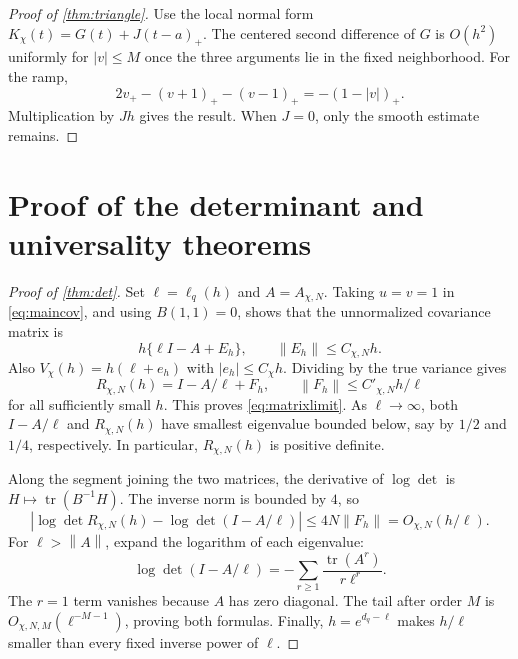 \documentclass[11pt]{article}
\theoremstyle{definition}
\newcommand{\tr}{\operatorname{tr}}
\newcommand{\norm}[1]{\left\|#1\right\|}
\begin{document}
\begin{proof}[Proof of \cref{thm:triangle}]
Use the local normal form $K_\chi(t)=G(t)+J(t-a)_+$. The centered second
difference of $G$ is $O(h^2)$ uniformly for $|v|\le M$ once the three arguments
lie in the fixed neighborhood. For the ramp,
\[
 2v_+-(v+1)_+-(v-1)_+=-(1-|v|)_+.
\]
Multiplication by $Jh$ gives the result. When $J=0$, only the smooth estimate remains.
\end{proof}

\section{Proof of the determinant and universality theorems}

\begin{proof}[Proof of \cref{thm:det}]
Set $\ell=\ell_q(h)$ and $A=A_{\chi,N}$. Taking $u=v=1$ in
\cref{eq:maincov}, and using $B(1,1)=0$, shows that the unnormalized covariance
matrix is
\[
 h\{\ell I-A+E_h\},\qquad \norm{E_h}\le C_{\chi,N}h.
\]
Also $V_\chi(h)=h(\ell+e_h)$ with $|e_h|\le C_\chi h$.
Dividing by the true variance gives
\begin{equation}\label{eq:Rapprox}
 R_{\chi,N}(h)=I-A/\ell+F_h,\qquad
 \norm{F_h}\le C'_{\chi,N}h/\ell
\end{equation}
for all sufficiently small $h$. This proves \cref{eq:matrixlimit}.
As $\ell\to\infty$, both $I-A/\ell$ and $R_{\chi,N}(h)$ have smallest
eigenvalue bounded below, say by $1/2$ and $1/4$, respectively. In particular,
$R_{\chi,N}(h)$ is positive definite.

Along the segment joining the two matrices, the derivative of $\log\det$ is
$H\mapsto\tr(B^{-1}H)$. The inverse norm is bounded by $4$, so
\[
 |\log\det R_{\chi,N}(h)-\log\det(I-A/\ell)|
 \le4N\norm{F_h}=O_{\chi,N}(h/\ell).
\]
For $\ell>\norm A$, expand the logarithm of each eigenvalue:
\[
 \log\det(I-A/\ell)
 =-\sum_{r\ge1}\frac{\tr(A^r)}{r\ell^r}.
\]
The $r=1$ term vanishes because $A$ has zero diagonal. The tail after order
$M$ is $O_{\chi,N,M}(\ell^{-M-1})$, proving both formulas. Finally,
$h=e^{d_q-\ell}$ makes $h/\ell$ smaller than every fixed inverse power of $\ell$.
\end{proof}
\end{document}
